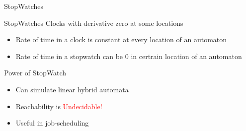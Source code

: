 \documentclass{beamer}
\begin{document}
         \begin{frame}{StopWatches}
      \begin{block}{StopWatches} Clocks with derivative zero at some locations
      \end{block}
      \begin{itemize}[<+->]
      \item Rate of time in a clock is constant at every location of an automaton
      \item Rate of time in a stopwatch can be 0  in certrain location of an automaton
      \end{itemize}
     \end{frame}
      \begin{frame}{Power of StopWatch}
      \begin{itemize}[<+->]
      \item Can simulate linear hybrid automata~
      \item Reachability is \textcolor{red}{Undecidable!}
      \item Useful in job-scheduling~

      \end{itemize}
      \end{frame}
\end{document}
